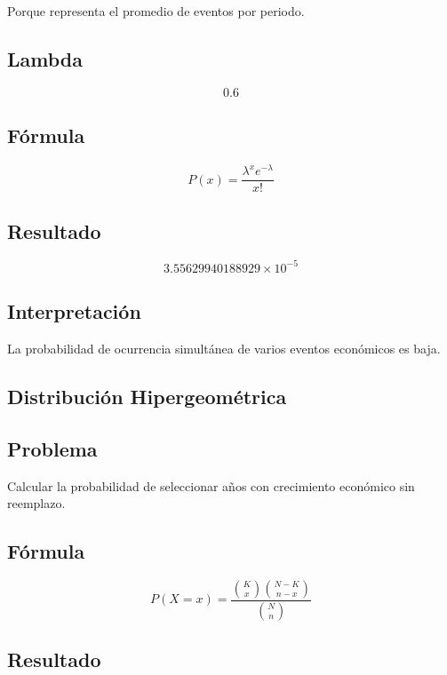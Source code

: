 \documentclass[12pt]{article}
\begin{document}
Porque representa el promedio de eventos por periodo.

\subsection*{Lambda}

\[
0.6
\]

\subsection*{Fórmula}

\[
P(x)=\frac{\lambda^x e^{-\lambda}}{x!}
\]

\subsection*{Resultado}

\[
3.55629940188929 \times 10^{-5}
\]

\subsection*{Interpretación}

La probabilidad de ocurrencia simultánea de varios eventos económicos es baja.


\subsection{Distribución Hipergeométrica}

\subsection*{Problema}

Calcular la probabilidad de seleccionar años con crecimiento económico sin reemplazo.

\subsection*{Fórmula}

\[
P(X=x)=
\frac{
\binom{K}{x}\binom{N-K}{n-x}
}{
\binom{N}{n}
}
\]

\subsection*{Resultado}
\end{document}
